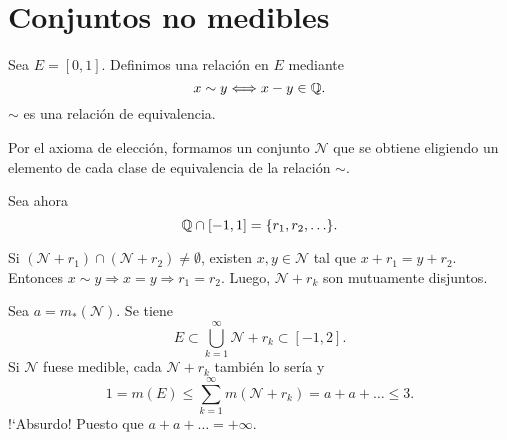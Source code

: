 \section{Conjuntos no medibles}

Sea $E=[0,1]$. 
Definimos una relaci\'on en $E$ mediante
\[
x \sim y \Longleftrightarrow  x-y\in \mathbb{Q}.
\]
$\sim$ es una relaci\'on de equivalencia.

Por el axioma de elecci\'on, formamos un  conjunto $\mathcal{N}$ que se obtiene eligiendo  un elemento de cada clase de equivalencia de la relaci\'on $\sim$.

Sea ahora 
\[
\mathbb{Q} \cap [-1,1] 
=\{r_1,r_2,\ldots \}.
\] 

Si $(\mathcal{N}+r_1)\cap (\mathcal{N}+r_2)\neq \emptyset$, 
existen $x,y\in \mathcal{N}$ tal que $x+r_1=y+r_2$. Entonces 
$x \sim y \Rightarrow x=y \Rightarrow r_1=r_2$.
Luego, $\mathcal{N}+r_k$ son mutuamente disjuntos.

Sea $a=m_{*}(\mathcal{N})$. 
Se tiene  
\[
E\subset \bigcup\limits_{k=1}^{\infty} \mathcal{N}+r_k
\subset [-1,2]. 
\]
Si $\mathcal{N}$ fuese medible, cada $\mathcal{N}+r_k$ tambi\'en lo ser\'ia y 
\[
1=m(E)\leq \sum\limits_{k=1}^{\infty}m(\mathcal{N}+r_k)=a+a+\ldots\leq 3. 
\]
!`Absurdo! Puesto que $a+a+\ldots=+\infty$.